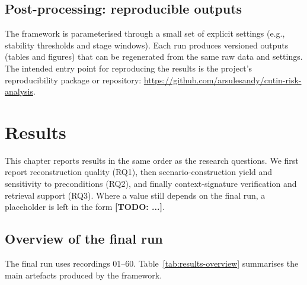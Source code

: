 \documentclass[12pt,a4paper,twoside,openright]{report}
\newcommand{\TODO}[1]{\textbf{[TODO: #1]}}
\newcommand{\ArtifactURL}{\url{https://github.com/arsulesandy/cutin-risk-analysis}}
\begin{document}
    \begin{algorithm}[t]
\caption{Ego-centric occupancy grid and space-filling-curve context signature}
\label{alg:sfc-signature}

    \end{algorithm}

    \section{Post-processing: reproducible outputs}
    The framework is parameterised through a small set of explicit settings (e.g., stability thresholds and stage windows). Each run produces versioned outputs (tables and figures) that can be regenerated from the same raw data and settings. The intended entry point for reproducing the results is the project's reproducibility package or repository: \ArtifactURL.

    \chapter{Results}
    \label{chap:results}

    This chapter reports results in the same order as the research questions. We first report reconstruction quality (RQ1), then scenario-construction yield and sensitivity to preconditions (RQ2), and finally context-signature verification and retrieval support (RQ3). Where a value still depends on the final run, a placeholder is left in the form \TODO{...}.

    \section{Overview of the final run}
    The final run uses recordings 01--60. Table~\ref{tab:results-overview} summarises the main artefacts produced by the framework.
\end{document}

